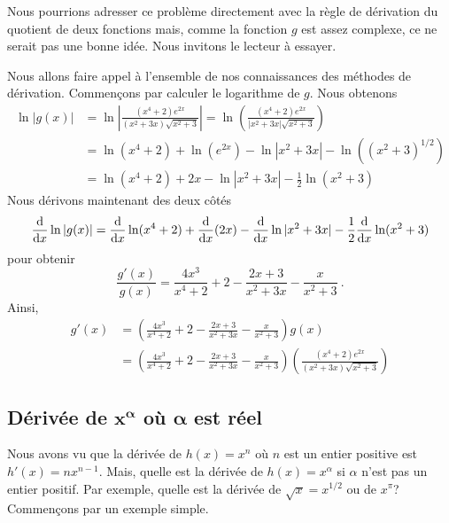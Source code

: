 {\begin{egg}
Nous pourrions adresser ce problème directement avec la règle de
dérivation du quotient de deux fonctions mais, comme la fonction $g$
est assez complexe, ce ne serait pas une bonne idée.  Nous invitons le
lecteur à essayer.

Nous allons faire appel à l'ensemble de nos connaissances des méthodes de
dérivation.  Commençons par calculer le logarithme de $g$.  Nous
obtenons
\begin{align*}
\ln|g(x)| &= \ln\left|\frac{(x^4+2)e^{2x}}{(x^2+3x)\sqrt{x^2+3}}\right|
= \ln\left(\frac{(x^4+2)e^{2x}}{|x^2+3x|\sqrt{x^2+3}}\right) \\
& = \ln(x^4+2) + \ln(e^{2x}) - \ln|x^2+3x| - \ln\left((x^2+3)^{1/2}\right) \\
& = \ln(x^4+2) + 2x - \ln|x^2+3x| -\frac{1}{2} \ln(x^2+3)
\end{align*}
Nous dérivons maintenant des deux côtés
\[
\dfdx{\ln|g(x)|}{x} = \dfdx{\ln(x^4+2)}{x} + \dfdx{(2x)}{x} -
\dfdx{\ln|x^2+3x|}{x} -\frac{1}{2} \dfdx{\ln(x^2+3)}{x}
\]
pour obtenir
\[
\frac{g'(x)}{g(x)} = \frac{4x^3}{x^4+2} + 2 -
\frac{2x + 3}{x^2+3x} - \frac{x}{x^2+3} \ .
\]
Ainsi,
\begin{align*}
g'(x) &= \left(\frac{4x^3}{x^4+2} + 2 -
\frac{2x + 3}{x^2+3x} - \frac{x}{x^2+3}\right) g(x) \\
&= \left(\frac{4x^3}{x^4+2} + 2 -
\frac{2x + 3}{x^2+3x} - \frac{x}{x^2+3}\right)
\left(\frac{(x^4+2)e^{2x}}{(x^2+3x)\sqrt{x^2+3}}\right)
\end{align*}
\end{egg}

\subsection{Dérivée de $\mathbf{x^\alpha}$ où $\mathbf{\alpha}$ est réel}

Nous avons vu que la dérivée de $h(x) = x^n$ où $n$ est un entier positive
est $h'(x) = nx^{n-1}$.  Mais, quelle est la dérivée de
$h(x) = x^{\alpha}$ si $\alpha$ n'est pas un entier positif.  Par
exemple, quelle est la dérivée de $\sqrt{x} = x^{1/2}$ ou de $x^\pi$?
Commençons par un exemple simple.

}
